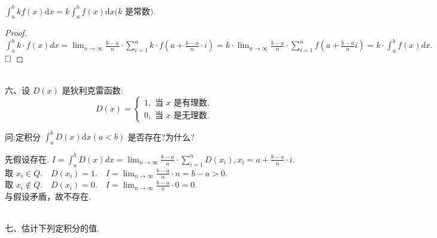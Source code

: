\documentclass[lang=cn,newtx,10pt,scheme=chinese]{elegantbook}
\begin{document}
$\displaystyle\int_a^b k f(x) \mathrm{d} x=k \int_a^b f(x) \mathrm{d} x(k \text { 是常数). } $\\

\begin{proof}
	$\displaystyle \int_a^b k \cdot f(x) d x=\lim _{n \rightarrow \infty} \frac{b-a}{n} \cdot \sum_{i=1}^n k \cdot f\left(a+\frac{b-a}{n} \cdot i\right) 
	=k \cdot \lim _{n \rightarrow \infty} \frac{b-a}{n} \cdot \sum_{i=1}^n f\left(a+\frac{b-a}{n} i\right)=k \cdot \displaystyle\int_a^b f(x) d x.$$\hfill\square$
\end{proof}

~\\
六、设 $D(x)$ 是狄利克雷函数:\\
$$
D(x)=\left\{\begin{array}{l}
	1, \text { 当 } x \text { 是有理数, } \\
	0, \text { 当 } x \text { 是无理数. }
\end{array}\right.
$$

问:定积分 $\displaystyle\int_a^b D(x) \mathrm{d} x(a<b)$ 是否存在?为什么?\\
\begin{solution}
	先假设存在. $I=\displaystyle\int_a^b D(x) d x=\lim _{n \rightarrow \infty} \frac{b-a}{n} \cdot \sum_{i=1}^n D\left(x_i\right), x_i=a+\frac{b-a}{n} \cdot i.
	$\\
 取 $x_i \displaystyle\in Q . \quad D\left(x_i\right)=1 . \quad I=\lim _{n \rightarrow \infty} \frac{b-a}{n} \cdot n=b-a>0$.\\
 取 $x_i \displaystyle\notin Q . \quad D\left(x_i\right)=0 . \quad I=\lim _{n \rightarrow \infty} \frac{b-a}{n} \cdot 0=0$.\\
与假设矛盾，故不存在.
~\\
\end{solution}
~\\
七、估计下列定积分的值.\\
\end{document}

